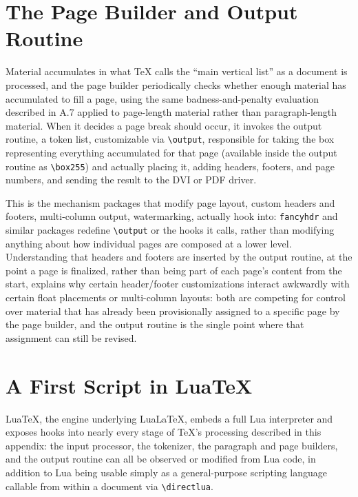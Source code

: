 \hypertarget{a.9-the-page-builder-and-output-routine}{%
\section{The Page Builder and Output Routine}\label{a.9-the-page-builder-and-output-routine}}

Material accumulates in what TeX calls the ``main vertical list'' as a document is processed, and the page builder periodically checks whether enough material has accumulated to fill a page, using the same badness-and-penalty evaluation described in A.7 applied to page-length material rather than paragraph-length material. When it decides a page break should occur, it invokes the output routine, a token list, customizable via \texttt{\textbackslash{}output}, responsible for taking the box representing everything accumulated for that page (available inside the output routine as \texttt{\textbackslash{}box255}) and actually placing it, adding headers, footers, and page numbers, and sending the result to the DVI or PDF driver.

This is the mechanism packages that modify page layout, custom headers and footers, multi-column output, watermarking, actually hook into: \texttt{fancyhdr} and similar packages redefine \texttt{\textbackslash{}output} or the hooks it calls, rather than modifying anything about how individual pages are composed at a lower level. Understanding that headers and footers are inserted by the output routine, at the point a page is finalized, rather than being part of each page's content from the start, explains why certain header/footer customizations interact awkwardly with certain float placements or multi-column layouts: both are competing for control over material that has already been provisionally assigned to a specific page by the page builder, and the output routine is the single point where that assignment can still be revised.

\hypertarget{a.10-a-first-script-in-luatex}{%
\section{A First Script in LuaTeX}\label{a.10-a-first-script-in-luatex}}

LuaTeX, the engine underlying LuaLaTeX, embeds a full Lua interpreter and exposes hooks into nearly every stage of TeX's processing described in this appendix: the input processor, the tokenizer, the paragraph and page builders, and the output routine can all be observed or modified from Lua code, in addition to Lua being usable simply as a general-purpose scripting language callable from within a document via \texttt{\textbackslash{}directlua}.

